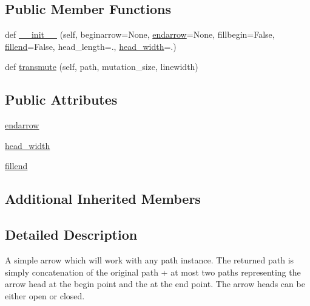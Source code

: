 \subsection*{Public Member Functions}
\begin{DoxyCompactItemize}
\item 
def \hyperlink{classmatplotlib_1_1patches_1_1ArrowStyle_1_1__Curve_ae604d6a88b746eec93db4767ebea04db}{\+\_\+\+\_\+init\+\_\+\+\_\+} (self, beginarrow=None, \hyperlink{classmatplotlib_1_1patches_1_1ArrowStyle_1_1__Curve_a6f214535620d4575f5366fde8f214ac4}{endarrow}=None, fillbegin=False, \hyperlink{classmatplotlib_1_1patches_1_1ArrowStyle_1_1__Curve_ae639819f3a29140d70468682f16af073}{fillend}=False, head\+\_\+length=., \hyperlink{classmatplotlib_1_1patches_1_1ArrowStyle_1_1__Curve_a360e40f4780784399d97fd36b8569ab7}{head\+\_\+width}=.)
\item 
def \hyperlink{classmatplotlib_1_1patches_1_1ArrowStyle_1_1__Curve_aa5e14f8f03c63e8c3af623ce74b275a0}{transmute} (self, path, mutation\+\_\+size, linewidth)
\end{DoxyCompactItemize}
\subsection*{Public Attributes}
\begin{DoxyCompactItemize}
\item 
\hyperlink{classmatplotlib_1_1patches_1_1ArrowStyle_1_1__Curve_a6f214535620d4575f5366fde8f214ac4}{endarrow}
\item 
\hyperlink{classmatplotlib_1_1patches_1_1ArrowStyle_1_1__Curve_a360e40f4780784399d97fd36b8569ab7}{head\+\_\+width}
\item 
\hyperlink{classmatplotlib_1_1patches_1_1ArrowStyle_1_1__Curve_ae639819f3a29140d70468682f16af073}{fillend}
\end{DoxyCompactItemize}
\subsection*{Additional Inherited Members}


\subsection{Detailed Description}
\begin{DoxyVerb}A simple arrow which will work with any path instance. The
returned path is simply concatenation of the original path + at
most two paths representing the arrow head at the begin point and the
at the end point. The arrow heads can be either open or closed.
\end{DoxyVerb}
 

